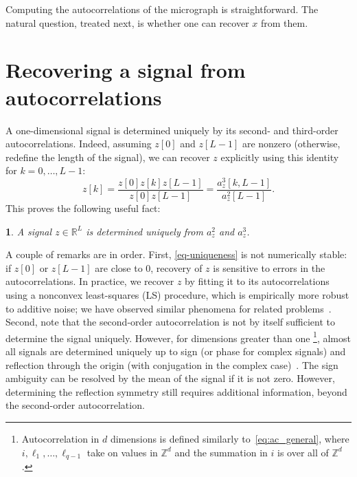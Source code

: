 \documentclass[12pt]{article}
\newcommand{\1}{\mathbf{1}}
\newcommand{\RL}{\mathbb{R}^L}
\theoremstyle{plain}
\theoremstyle{definition}
\theoremstyle{remark}
\theoremstyle{plain}
\theoremstyle{remark}
\theoremstyle{plain}
\theoremstyle{plain}
\newtheorem{proposition}[thm]{\protect\propositionname}
\providecommand{\propositionname}{Proposition}
\begin{document}
Computing the autocorrelations of the micrograph is straightforward. The natural question, treated next, is whether one can recover $x$ from them.


\section{Recovering a signal from autocorrelations} \label{sec:recovery}

A one-dimensional signal is determined uniquely by its second- and third-order autocorrelations. Indeed, assuming $z[0]$ and $z[L-1]$ are nonzero (otherwise, redefine the length of the signal), we can recover $z$ explicitly using this identity for $k = 0, \ldots, L-1$:
%
\begin{equation}
%
z[k]  = \frac{z[0]z[k]z[L-1]}{z[0]z[L-1]} = \frac{a_z^3[k,L-1]}{a_z^2[L-1]}.
\label{eq-uniqueness}
%
\end{equation}
This proves the following useful fact:
\begin{proposition} \label{prop:uniqueness}
	A signal $z\in\RL$ is determined uniquely from  $a_z^2$ and $a_z^3$.
\end{proposition}

A couple of remarks are in order. First, \eqref{eq-uniqueness} is not numerically stable: if $z[0]$ or $z[L-1]$ are close to 0, recovery of $z$ is sensitive to errors in the autocorrelations. In practice, we recover $z$ by fitting it to its autocorrelations using a nonconvex least-squares (LS) procedure, which is empirically more robust to additive noise; we have observed similar phenomena for related problems~\cite{bendory2017bispectrum,boumal2017heterogeneous,abbe2017multireference}.
Second, note that the second-order autocorrelation is not by itself sufficient to determine the signal uniquely. %
However, for dimensions greater than one \footnote{Autocorrelation in $d$ dimensions is defined similarly to~\eqref{eq:ac_general}, where $ i, \ell_1, \ldots, \ell_{q-1}$ take on values in $\mathbb{Z}^d$ and the summation in $i$ is over all of $\mathbb{Z}^d$.}, almost all signals are determined uniquely up to sign (or phase for complex signals) and reflection through the origin (with conjugation in the complex case)~\cite{hayes1982reconstruction}. 
The sign ambiguity can be resolved by the mean of the signal if it is not zero. However, determining the reflection symmetry still requires additional information, beyond the second-order autocorrelation.
\end{document}
